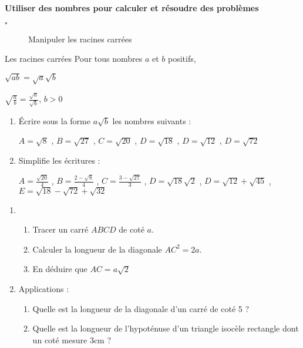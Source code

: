 \begin{titre}

\end{titre}


\begin{CpsCol}
\textbf{Utiliser des nombres pour calculer et résoudre des problèmes}
\begin{description}
\item[$\square$] Manipuler les racines carrées
\end{description}
\end{CpsCol}


\begin{ThT}{Les racines carrées}
Pour tous nombres $a$ et $b$ positifs, 
\begin{description}
\item $\sqrt{ab}=\sqrt{a}\sqrt{b}$
\item $\sqrt{\frac{a}{b}}=\frac{\sqrt{a}}{\sqrt{b}}$, $b >0$
\end{description}
\end{ThT}


\Exo

\begin{enumerate}
\item Écrire sous la forme $a\sqrt{b}$ les nombres suivants :

$A = \sqrt{8}$ , $B=\sqrt{27}$ , $C=\sqrt{20}$  , $D=\sqrt{18}$  , $D=\sqrt{12}$  , $D=\sqrt{72}$

\item

Simplifie les écritures :

$A=\frac{\sqrt{20}}{4}$ , $B = \frac{2-\sqrt{8}}{4}$ , $C=\frac{3-\sqrt{27}}{3}$ , $D=\sqrt{18}\sqrt{2}$  , $D=\sqrt{12}+\sqrt{45}$  , $E=\sqrt{18} -\sqrt{72} +\sqrt{32}$

\end{enumerate}


\Exo

\begin{enumerate}
\item
\begin{enumerate}
\item Tracer un carré $ABCD$ de coté $a$.  
\item Calculer la longueur de la diagonale $AC^2=2a$.
\item En déduire que $AC=a\sqrt{2}$
\end{enumerate}
\item
Applications : 
\begin{enumerate}
\item Quelle est la longueur de la diagonale d'un carré de coté 5 ?
\item Quelle est la longueur de l'hypoténuse d'un triangle isocèle rectangle dont un coté mesure 3cm ?
\end{enumerate}
\end{enumerate}



